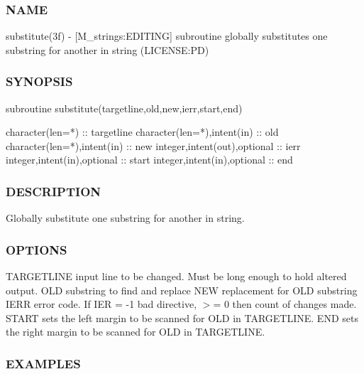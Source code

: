\subsubsection*{N\+A\+ME}

substitute(3f) -\/ \mbox{[}M\+\_\+strings\+:E\+D\+I\+T\+I\+NG\mbox{]} subroutine globally substitutes one substring for another in string (L\+I\+C\+E\+N\+SE\+:PD) 

\subsubsection*{S\+Y\+N\+O\+P\+S\+IS}

\begin{DoxyVerb}subroutine substitute(targetline,old,new,ierr,start,end)

 character(len=*)              :: targetline
 character(len=*),intent(in)   :: old
 character(len=*),intent(in)   :: new
 integer,intent(out),optional  :: ierr
 integer,intent(in),optional   :: start
 integer,intent(in),optional   :: end
\end{DoxyVerb}
 \subsubsection*{D\+E\+S\+C\+R\+I\+P\+T\+I\+ON}

Globally substitute one substring for another in string.

\subsubsection*{O\+P\+T\+I\+O\+NS}

T\+A\+R\+G\+E\+T\+L\+I\+NE input line to be changed. Must be long enough to hold altered output. O\+LD substring to find and replace N\+EW replacement for O\+LD substring I\+E\+RR error code. If I\+ER = -\/1 bad directive, $>$= 0 then count of changes made. S\+T\+A\+RT sets the left margin to be scanned for O\+LD in T\+A\+R\+G\+E\+T\+L\+I\+NE. E\+ND sets the right margin to be scanned for O\+LD in T\+A\+R\+G\+E\+T\+L\+I\+NE.

\subsubsection*{E\+X\+A\+M\+P\+L\+ES}


